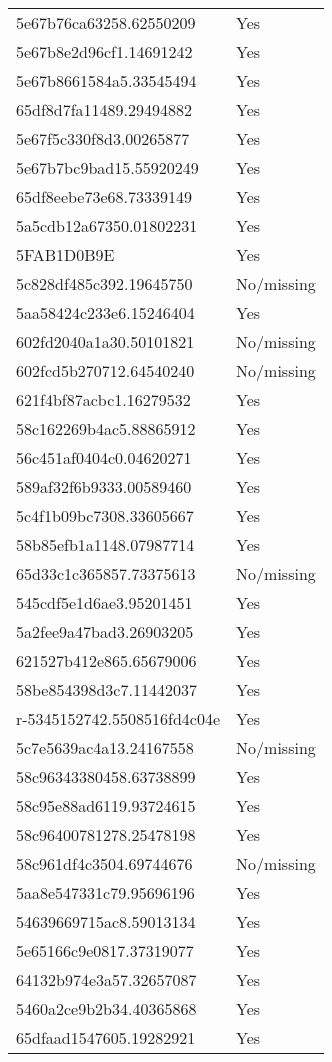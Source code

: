 \begin{tabular}{ll}
5e67b76ca63258.62550209 & Yes \\
5e67b8e2d96cf1.14691242 & Yes \\
5e67b8661584a5.33545494 & Yes \\
65df8d7fa11489.29494882 & Yes \\
5e67f5c330f8d3.00265877 & Yes \\
5e67b7bc9bad15.55920249 & Yes \\
65df8eebe73e68.73339149 & Yes \\
5a5cdb12a67350.01802231 & Yes \\
5FAB1D0B9E & Yes \\
5c828df485c392.19645750 & No/missing \\
5aa58424c233e6.15246404 & Yes \\
602fd2040a1a30.50101821 & No/missing \\
602fcd5b270712.64540240 & No/missing \\
621f4bf87acbc1.16279532 & Yes \\
58c162269b4ac5.88865912 & Yes \\
56c451af0404c0.04620271 & Yes \\
589af32f6b9333.00589460 & Yes \\
5c4f1b09bc7308.33605667 & Yes \\
58b85efb1a1148.07987714 & Yes \\
65d33c1c365857.73375613 & No/missing \\
545cdf5e1d6ae3.95201451 & Yes \\
5a2fee9a47bad3.26903205 & Yes \\
621527b412e865.65679006 & Yes \\
58be854398d3c7.11442037 & Yes \\
r-5345152742.5508516fd4c04e & Yes \\
5c7e5639ac4a13.24167558 & No/missing \\
58c96343380458.63738899 & Yes \\
58c95e88ad6119.93724615 & Yes \\
58c96400781278.25478198 & Yes \\
58c961df4c3504.69744676 & No/missing \\
5aa8e547331c79.95696196 & Yes \\
54639669715ac8.59013134 & Yes \\
5e65166c9e0817.37319077 & Yes \\
64132b974e3a57.32657087 & Yes \\
5460a2ce9b2b34.40365868 & Yes \\
65dfaad1547605.19282921 & Yes \\

\end{tabular}
